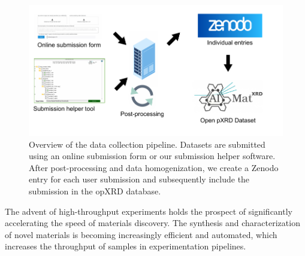 


\begin{figure}[!ht]
    \centering
    \includegraphics{figures/overview.pdf}
    \caption{Overview of the data collection pipeline. Datasets are submitted using an online submission form or our submission helper software. After post-processing and data homogenization, we create a Zenodo entry for each user submission and subsequently include the submission in the opXRD database.}
    \label{fig:overview}
\end{figure}

The advent of high-throughput experiments holds the prospect of significantly accelerating the speed of materials discovery. 
The synthesis and characterization of novel materials is becoming increasingly efficient and automated,
which increases the throughput of samples in experimentation pipelines.



